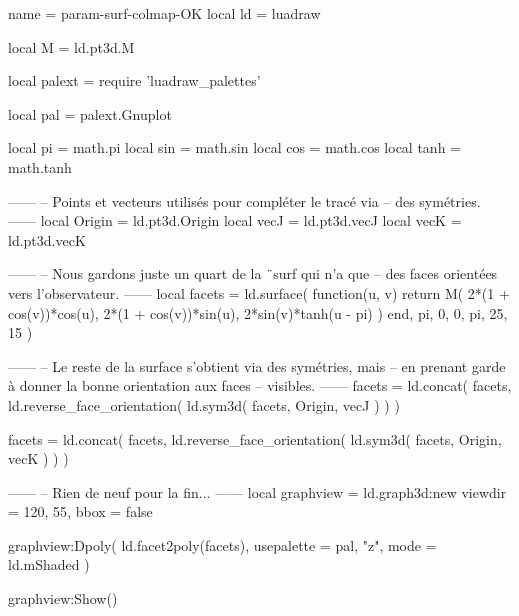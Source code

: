 \documentclass[border = 3pt]{standalone}
\begin{document}
\begin{luadraw*}{name = param-surf-colmap-OK}
local ld = luadraw

local M = ld.pt3d.M

local palext = require 'luadraw_palettes'

local pal = palext.Gnuplot

local pi   = math.pi
local sin  = math.sin
local cos  = math.cos
local tanh = math.tanh

------
-- Points et vecteurs utilisés pour compléter le tracé via
-- des symétries.
------
local Origin = ld.pt3d.Origin
local vecJ   = ld.pt3d.vecJ
local vecK   = ld.pt3d.vecK

------
-- Nous gardons juste un quart de la ¨surf qui n'a que
-- des faces orientées vers l'observateur.
------
local facets = ld.surface(
  function(u, v)
    return M(
      2*(1 + cos(v))*cos(u),
      2*(1 + cos(v))*sin(u),
      2*sin(v)*tanh(u - pi)
    )
  end,
  pi, 0, 0, pi,
  {25, 15}
)

------
-- Le reste de la surface s'obtient via des symétries, mais
-- en prenant garde à donner la bonne orientation aux faces
-- visibles.
------
facets = ld.concat(
  facets,
  ld.reverse_face_orientation(
    ld.sym3d(
      facets,
      {Origin, vecJ}
    )
  )
)

facets = ld.concat(
  facets,
  ld.reverse_face_orientation(
    ld.sym3d(
      facets,
      {Origin, vecK}
    )
  )
)

------
-- Rien de neuf pour la fin...
------
local graphview = ld.graph3d:new{
  viewdir = {120, 55},
  bbox    = false
}

graphview:Dpoly(
  ld.facet2poly(facets),
  {
    usepalette = {pal, "z"},
    mode       = ld.mShaded
  }
)

graphview:Show()
\end{luadraw*}
\end{document}
